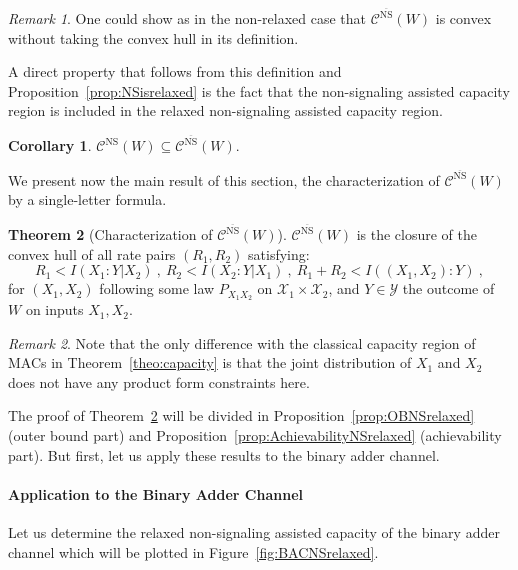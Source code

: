 \documentclass[11pt]{article}
\theoremstyle{definition}
\newtheorem{theo}{Theorem}[section]
\newtheorem{cor}[theo]{Corollary}
\theoremstyle{remark}
\newtheorem*{rk}{Remark}
\begin{document}
  \begin{rk}
    One could show as in the non-relaxed case that $\mathcal{C}^{\overline{\mathrm{NS}}}(W)$ is convex without taking the convex hull in its definition.
  \end{rk}

  A direct property that follows from this definition and Proposition~\ref{prop:NSisrelaxed} is the fact that the non-signaling assisted capacity region is included in the relaxed non-signaling assisted capacity region.
  \begin{cor}
    \label{cor:NSisrelaxed}
      $\mathcal{C}^{\mathrm{NS}}(W) \subseteq \mathcal{C}^{\overline{\mathrm{NS}}}(W)$.
  \end{cor}

  We present now the main result of this section, the characterization of $\mathcal{C}^{\overline{\mathrm{NS}}}(W)$ by a single-letter formula.
  
  \begin{theo}[Characterization of $\mathcal{C}^{\overline{\mathrm{NS}}}(W)$]
        \label{theo:CharaNSrelaxed}
        $\mathcal{C}^{\overline{\mathrm{NS}}}(W)$ is the closure of the convex hull of all rate pairs $(R_1,R_2)$ satisfying:
        \[ R_1 < I(X_1:Y|X_2)\ ,\ R_2 < I(X_2:Y|X_1)\ ,\ R_1+R_2 < I((X_1,X_2):Y) \ ,\]
        for $(X_1,X_2)$ following some law $P_{X_1X_2}$ on $\mathcal{X}_1 \times \mathcal{X}_2$, and $Y \in \mathcal{Y}$ the outcome of $W$ on inputs $X_1,X_2$.
  \end{theo}

  \begin{rk}
    Note that the only difference with the classical capacity region of MACs in Theorem~\ref{theo:capacity} is that the joint distribution of $X_1$ and $X_2$ does not have any product form constraints here.
  \end{rk}

  The proof of Theorem~\ref{theo:CharaNSrelaxed} will be divided in Proposition~\ref{prop:OBNSrelaxed} (outer bound part) and Proposition~\ref{prop:AchievabilityNSrelaxed} (achievability part). But first, let us apply these results to the binary adder channel.
  
  \paragraph{Application to the Binary Adder Channel} 
  Let us determine the relaxed non-signaling assisted capacity of the binary adder channel which will be plotted in Figure~\ref{fig:BACNSrelaxed}.
  
\end{document}
